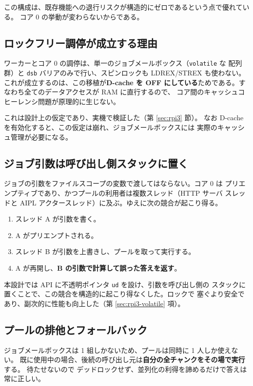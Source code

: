 \documentclass[11pt,a4paper]{article}
\begin{document}
この構成は、既存機能への退行リスクが構造的にゼロであるという点で優れている。
コア 0 の挙動が変わらないからである。

\subsection{ロックフリー調停が成立する理由}

ワーカーとコア 0 の調停は、単一のジョブメールボックス（\texttt{volatile} な
配列群）と \texttt{dsb} バリアのみで行い、スピンロックも
LDREX/STREX も使わない。これが成立するのは、この移植が\textbf{D-cache を
OFF にしている}ためである。すなわち全てのデータアクセスが RAM に直行するので、
コア間のキャッシュコヒーレンシ問題が原理的に生じない。

これは設計上の仮定であり、実機で検証した（第 \ref{sec:rpi3} 節）。
なお D-cache を有効化すると、この仮定は崩れ、ジョブメールボックスには
実際のキャッシュ管理が必要になる。

\subsection{ジョブ引数は呼び出し側スタックに置く}
\label{sec:ud}

ジョブの引数をファイルスコープの変数で渡してはならない。コア 0 は
プリエンプティブであり、かつプールの利用者は複数スレッド（HTTP サーバ
スレッドと AIPL アクタースレッド）に及ぶ。ゆえに次の競合が起こり得る。

\begin{enumerate}[leftmargin=1.6em]
  \item スレッド A が引数を書く。
  \item A がプリエンプトされる。
  \item スレッド B が引数を上書きし、プールを取って実行する。
  \item A が再開し、\textbf{B の引数で計算して誤った答えを返す}。
\end{enumerate}

本設計では API に不透明ポインタ \texttt{ud} を設け、引数を呼び出し側の
スタックに置くことで、この競合を構造的に起こり得なくした。ロックで
塞ぐより安全であり、副次的に性能も向上した（第 \ref{sec:rpi3-volatile} 項）。

\subsection{プールの排他とフォールバック}

ジョブメールボックスは 1 組しかないため、プールは同時に 1 人しか使えない。
既に使用中の場合、後続の呼び出し元は\textbf{自分の全チャンクをその場で実行}する。
待たせないので デッドロックせず、並列化の利得を諦めるだけで答えは常に正しい。
\end{document}
